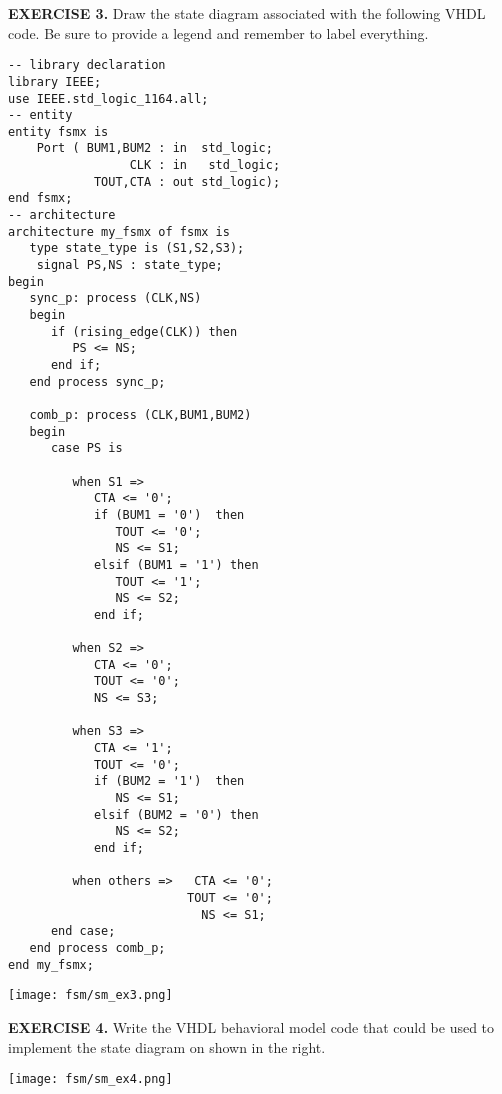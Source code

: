\vspace{20pt}
\noindent
\begin{minipage}{1\textwidth}
\textbf{EXERCISE 3.}
Draw the state diagram associated with the following VHDL code. Be sure to provide a legend and remember to label everything.
\end{minipage}
\begin{minipage}{0.66\textwidth}
\vspace{10px}
\begin{lstlisting}
-- library declaration
library IEEE;
use IEEE.std_logic_1164.all;
-- entity
entity fsmx is
    Port ( BUM1,BUM2 : in  std_logic;
                 CLK : in   std_logic;
            TOUT,CTA : out std_logic);
end fsmx;
-- architecture
architecture my_fsmx of fsmx is
   type state_type is (S1,S2,S3); 
	signal PS,NS : state_type; 
begin
   sync_p: process (CLK,NS)
   begin
      if (rising_edge(CLK)) then   
         PS <= NS; 
      end if; 
   end process sync_p; 

   comb_p: process (CLK,BUM1,BUM2)
   begin
      case PS is 

         when S1 => 
            CTA <= '0'; 
            if (BUM1 = '0')  then 
               TOUT <= '0'; 
               NS <= S1; 
            elsif (BUM1 = '1') then 
               TOUT <= '1';  
               NS <= S2; 
            end if; 

         when S2 =>
            CTA <= '0'; 
            TOUT <= '0'; 
            NS <= S3;   

         when S3 =>
            CTA <= '1'; 
            TOUT <= '0';   
            if (BUM2 = '1')  then 
               NS <= S1; 
            elsif (BUM2 = '0') then 
               NS <= S2; 
            end if; 
      
         when others =>   CTA <= '0'; 
                         TOUT <= '0';
                           NS <= S1;
      end case; 
   end process comb_p; 
end my_fsmx;
\end{lstlisting}
\end{minipage}
\begin{minipage}{0.29\textwidth}
\texttt{[image: fsm/sm\_ex3.png]}
\vspace{250px}
\end{minipage}

\vspace{20pt}
\noindent
\begin{minipage}[t]{0.5\textwidth}
\textbf{EXERCISE 4.}
Write the VHDL behavioral model code that could be used to implement the state diagram on shown in the right.
\end{minipage}
\begin{minipage}[t]{0.47\textwidth}
\vspace{0pt}\raggedright
\centering
\texttt{[image: fsm/sm\_ex4.png]}
\end{minipage}

